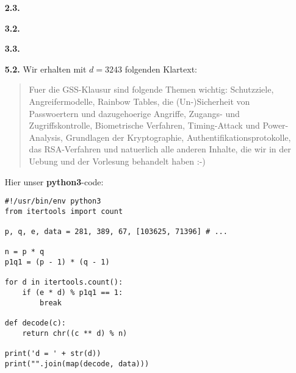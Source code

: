 \documentclass[a4paper,11pt]{article}
\begin{document}
\begin{enumerate}
\item[\textbf{2.3.}]

\item[\textbf{3.2.}]

\item[\textbf{3.3.}]

\item[\textbf{5.2.}]
    Wir erhalten mit $d=3243$ folgenden Klartext:
    \begin{quote}
        Fuer die GSS-Klausur sind folgende Themen wichtig: Schutzziele, Angreifermodelle, Rainbow Tables, die (Un-)Sicherheit von Passwoertern und dazugehoerige Angriffe, Zugangs- und Zugriffskontrolle, Biometrische Verfahren, Timing-Attack und Power-Analysis, Grundlagen der Kryptographie, Authentifikationsprotokolle, das RSA-Verfahren und natuerlich alle anderen Inhalte, die wir in der Uebung und der Vorlesung behandelt haben :-)
    \end{quote}

    Hier unser \textbf{python3}-code:\begin{verbatim}
#!/usr/bin/env python3
from itertools import count

p, q, e, data = 281, 389, 67, [103625, 71396] # ...

n = p * q
p1q1 = (p - 1) * (q - 1)

for d in itertools.count():
    if (e * d) % p1q1 == 1:
        break

def decode(c):
    return chr((c ** d) % n)

print('d = ' + str(d))
print("".join(map(decode, data)))
\end{verbatim}

\end{enumerate}
\end{document}
